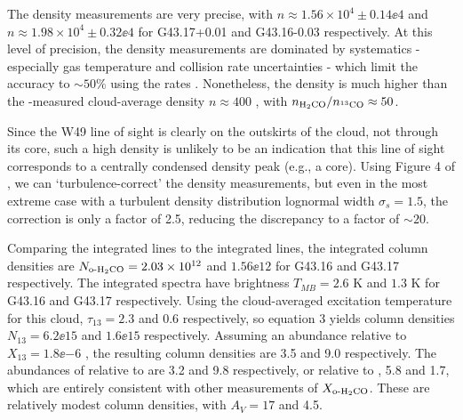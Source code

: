 The density measurements are very precise, with $n\approx1.56\times10^4 \pm
0.14\ee{4}$ \percc and $n\approx 1.98\times10^4 \pm 0.32\ee{4}$ \percc for
G43.17+0.01 and G43.16-0.03 respectively.  At this level of precision, the 
density measurements are dominated by systematics - especially gas temperature
and collision rate uncertainties - which limit the accuracy to $\sim50\%$ using
the \citet{Green1991} rates
\citep{Zeiger2010}.  Nonetheless, the density is much higher than the
\thirteenco-measured cloud-average density $n\approx 400$ \percc
\citep[for cloud GRSMC\_G043.04-00.11;][]{Roman-Duval2010a}, with
$n_{\textrm{H}_2\textrm{CO}}/n_{^{13}\textrm{CO}} \approx 50$.  

Since the W49 line of sight is clearly on the outskirts of the cloud, not
through its core, such a high density is unlikely to be an indication that
this line of sight corresponds to a centrally condensed density peak (e.g., a core).  Using
Figure 4 of \citet{Ginsburg2011a}, we can `turbulence-correct' the density
measurements, but even in the most extreme case with a turbulent density
distribution lognormal width $\sigma_s = 1.5$, the correction is only a factor
of 2.5, reducing the discrepancy to a factor of $\sim20$.


Comparing the integrated \formaldehyde lines to the integrated \thirteenco
lines, the integrated \formaldehyde column densities are
$N_{\textrm{o-H}_2\textrm{CO}} = 2.03\times10^{12} $ and $1.56\ee{12}$ \persc for G43.16
and G43.17 respectively.
The \thirteenco integrated spectra have brightness $T_{MB} = 2.6$ K and $1.3$ K
for G43.16 and G43.17 respectively.  Using the cloud-averaged excitation
temperature for this cloud, $\tau_{13}=2.3$ and $0.6$ respectively, so
\citet{Roman-Duval2010a} equation 3 yields column densities $N_{13} = 6.2\ee{15}
$ and $1.6\ee{15}$ \percc respectively.  Assuming an abundance relative to \hh
$X_{13} = 1.8\ee{-6}$ \citep[consistent with ][]{Roman-Duval2010a}, the
resulting \hh column densities are 3.5 and 9.0  \percc
respectively.  The abundances of \ortho relative to \thirteenco are 3.2
and 9.8 respectively, or relative to \hh, 5.8 and 1.7,
which are entirely consistent with other measurements of $X_{\textrm{o-H}_2\textrm{CO}}$.  These
are relatively modest column densities, with $A_V=17$ and 4.5.

